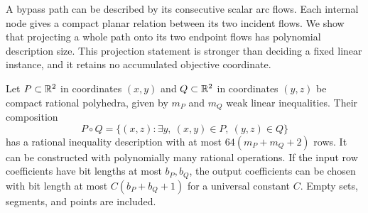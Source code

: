 A bypass path can be described by its consecutive scalar arc flows.
Each internal node gives a compact planar relation between its two
incident flows. We show that projecting a whole path onto its two
endpoint flows has polynomial description size. This projection
statement is stronger than deciding a fixed linear instance, and it
retains no accumulated objective coordinate.

\begin{lemma}\label{s4:polygon-composition}
Let $P\subset\mathbb R^2$ in coordinates $(x,y)$ and $Q\subset\mathbb R^2$ in
coordinates $(y,z)$ be compact rational polyhedra, given by $m_P$ and
$m_Q$ weak linear inequalities. Their composition
\[
 P\circ Q=\{(x,z):\exists y,\ (x,y)\in P,\ (y,z)\in Q\}
\]
has a rational inequality description with at most
$64(m_P+m_Q+2)$ rows. It can be constructed with polynomially many
rational operations. If the input row coefficients have bit lengths
at most $b_P,b_Q$, the output coefficients can be chosen with bit
length at most $C(b_P+b_Q+1)$ for a universal constant $C$.
Empty sets, segments, and points are included.
\end{lemma}
